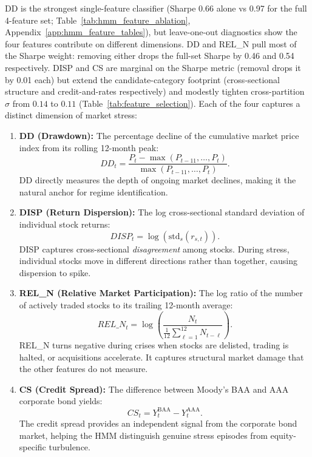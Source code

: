 DD is the strongest single-feature classifier (Sharpe 0.66 alone vs 0.97 for the full 4-feature set; Table~\ref{tab:hmm_feature_ablation}, Appendix~\ref{app:hmm_feature_tables}), but leave-one-out diagnostics show the four features contribute on different dimensions. DD and REL\_N pull most of the Sharpe weight: removing either drops the full-set Sharpe by 0.46 and 0.54 respectively. DISP and CS are marginal on the Sharpe metric (removal drops it by 0.01 each) but extend the candidate-category footprint (cross-sectional structure and credit-and-rates respectively) and modestly tighten cross-partition $\sigma$ from $0.14$ to $0.11$ (Table~\ref{tab:feature_selection}). Each of the four captures a distinct dimension of market stress:
\begin{enumerate}
    \item \textbf{DD (Drawdown):} The percentage decline of the cumulative market price index from its rolling 12-month peak:
    \begin{equation}
        DD_t = \frac{P_t - \max(P_{t-11}, \dots, P_t)}{\max(P_{t-11}, \dots, P_t)}.
    \end{equation}
    DD directly measures the depth of ongoing market declines, making it the natural anchor for regime identification.

    \item \textbf{DISP (Return Dispersion):} The log cross-sectional standard deviation of individual stock returns:
    \begin{equation}
        DISP_t = \log\!\left(\text{std}_s(r_{s,t})\right).
    \end{equation}
    DISP captures cross-sectional \emph{disagreement} among stocks. During stress, individual stocks move in different directions rather than together, causing dispersion to spike.

    \item \textbf{REL\_N (Relative Market Participation):} The log ratio of the number of actively traded stocks to its trailing 12-month average:
    \begin{equation}
        REL\_N_t = \log\!\left(\frac{N_t}{\frac{1}{12}\sum_{\ell=1}^{12} N_{t-\ell}}\right).
    \end{equation}
    REL\_N turns negative during crises when stocks are delisted, trading is halted, or acquisitions accelerate. It captures structural market damage that the other features do not measure.

    \item \textbf{CS (Credit Spread):} The difference between Moody's BAA and AAA corporate bond yields:
    \begin{equation}
        CS_t = Y_t^{\text{BAA}} - Y_t^{\text{AAA}}.
    \end{equation}
    The credit spread provides an independent signal from the corporate bond market, helping the HMM distinguish genuine stress episodes from equity-specific turbulence.
\end{enumerate}

